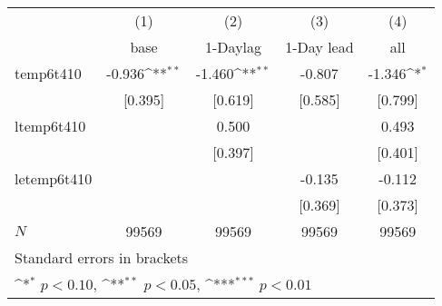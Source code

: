 {
\def\sym#1{\ifmmode^{#1}\else\(^{#1}\)\fi}
\begin{tabular}{l*{4}{c}}
\hline\hline
            &\multicolumn{1}{c}{(1)}&\multicolumn{1}{c}{(2)}&\multicolumn{1}{c}{(3)}&\multicolumn{1}{c}{(4)}\\
            &\multicolumn{1}{c}{base}&\multicolumn{1}{c}{1-Daylag}&\multicolumn{1}{c}{1-Day lead}&\multicolumn{1}{c}{all}\\
\hline
temp6t410   &      -0.936\sym{**} &      -1.460\sym{**} &      -0.807         &      -1.346\sym{*}  \\
            &     [0.395]         &     [0.619]         &     [0.585]         &     [0.799]         \\
[1em]
ltemp6t410  &                     &       0.500         &                     &       0.493         \\
            &                     &     [0.397]         &                     &     [0.401]         \\
[1em]
letemp6t410 &                     &                     &      -0.135         &      -0.112         \\
            &                     &                     &     [0.369]         &     [0.373]         \\
\hline
\(N\)       &       99569         &       99569         &       99569         &       99569         \\
\hline\hline
\multicolumn{5}{l}{\footnotesize Standard errors in brackets}\\
\multicolumn{5}{l}{\footnotesize \sym{*} \(p<0.10\), \sym{**} \(p<0.05\), \sym{***} \(p<0.01\)}\\
\end{tabular}
}
